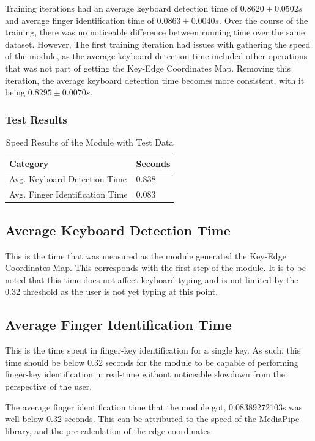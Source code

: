 \documentclass{report}
\begin{document}
Training iterations had an average keyboard detection time of $0.8620\pm0.0502s$
and average finger identification time of $0.0863\pm0.0040s$. Over the course of
the training, there was no noticeable difference between running time over the
same dataset. However, The first training iteration had issues with gathering
the speed of the module, as the average keyboard detection time included other
operations that was not part of getting the Key-Edge Coordinates Map. Removing
this iteration, the average keyboard detection time becomes more consistent,
with it being $0.8295\pm0.0070s$.

\subsubsection{Test Results}

\begin{table}[H]
	\small
	\centering
	\begin{tabular}{ p{} R{0.2\textwidth} }
		\toprule
		Category                        & Seconds \\
		\midrule
		Avg. Keyboard Detection Time    & 0.838   \\
		Avg. Finger Identification Time & 0.083   \\
		\bottomrule
	\end{tabular}
	\caption{\label{tab:rd-speed}Speed Results of the Module with Test Data}
\end{table}

\subsection{Average Keyboard Detection Time}
This is the time that was measured as the module generated the Key-Edge
Coordinates Map. This corresponds with the first step of the module. It is to be
noted that this time does not affect keyboard typing and is not limited by the
0.32 threshold as the user is not yet typing at this point.

\subsection{Average Finger Identification Time}
This is the time spent in finger-key identification for a single key. As such,
this time should be below 0.32 seconds for the module to be capable of
performing finger-key identification in real-time without noticeable slowdown
from the perspective of the user.

The average finger identification time that the module got, 0.08389272103s was
well below 0.32 seconds. This can be attributed to the speed of the MediaPipe
library, and the pre-calculation of the edge coordinates.
\end{document}
